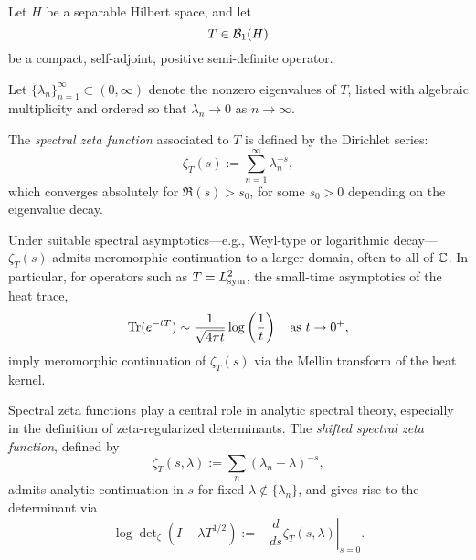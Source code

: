 \begin{definition}
\label{def:spectral_zeta_function}

Let \( H \) be a separable Hilbert space, and let
\[
T \in \mathcal{B}_1(H)
\]
be a compact, self-adjoint, positive semi-definite operator.

Let \( \{ \lambda_n \}_{n=1}^\infty \subset (0,\infty) \) denote the nonzero eigenvalues of \( T \), listed with algebraic multiplicity and ordered so that \( \lambda_n \to 0 \) as \( n \to \infty \).

\medskip

The \emph{spectral zeta function} associated to \( T \) is defined by the Dirichlet series:
\[
\zeta_T(s) := \sum_{n=1}^\infty \lambda_n^{-s},
\]
which converges absolutely for \( \Re(s) > s_0 \), for some \( s_0 > 0 \) depending on the eigenvalue decay.

\medskip

Under suitable spectral asymptotics—e.g., Weyl-type or logarithmic decay—\( \zeta_T(s) \) admits meromorphic continuation to a larger domain, often to all of \( \mathbb{C} \). In particular, for operators such as \( T = L_{\mathrm{sym}}^2 \), the small-time asymptotics of the heat trace,
\[
\operatorname{Tr}(e^{-tT}) \sim \frac{1}{\sqrt{4\pi t}} \log\left( \frac{1}{t} \right)
\quad \text{as } t \to 0^+,
\]
imply meromorphic continuation of \( \zeta_T(s) \) via the Mellin transform of the heat kernel.

\medskip

Spectral zeta functions play a central role in analytic spectral theory, especially in the definition of zeta-regularized determinants. The \emph{shifted spectral zeta function}, defined by
\[
\zeta_T(s, \lambda) := \sum_n (\lambda_n - \lambda)^{-s},
\]
admits analytic continuation in \( s \) for fixed \( \lambda \notin \{ \lambda_n \} \), and gives rise to the determinant via
\[
\log \det\nolimits_\zeta(I - \lambda T^{1/2}) := -\left.\frac{d}{ds} \zeta_T(s, \lambda)\right|_{s = 0}.
\]
\end{definition}
